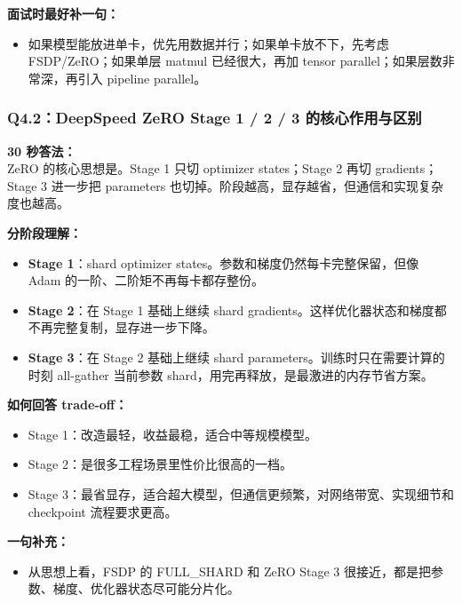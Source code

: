 \textbf{面试时最好补一句：}
\begin{itemize}[leftmargin=1.5em]
  \item 如果模型能放进单卡，优先用数据并行；如果单卡放不下，先考虑 FSDP/ZeRO；如果单层 matmul 已经很大，再加 tensor parallel；如果层数非常深，再引入 pipeline parallel。
\end{itemize}

\subsubsection{Q4.2：DeepSpeed ZeRO Stage 1 / 2 / 3 的核心作用与区别}

\begin{conceptbox}
\textbf{30 秒答法：}\\
ZeRO 的核心思想是。Stage 1 只切 optimizer states；Stage 2 再切 gradients；Stage 3 进一步把 parameters 也切掉。阶段越高，显存越省，但通信和实现复杂度也越高。
\end{conceptbox}

\textbf{分阶段理解：}
\begin{itemize}[leftmargin=1.5em]
  \item \textbf{Stage 1}：shard optimizer states。参数和梯度仍然每卡完整保留，但像 Adam 的一阶、二阶矩不再每卡都存整份。
  \item \textbf{Stage 2}：在 Stage 1 基础上继续 shard gradients。这样优化器状态和梯度都不再完整复制，显存进一步下降。
  \item \textbf{Stage 3}：在 Stage 2 基础上继续 shard parameters。训练时只在需要计算的时刻 all-gather 当前参数 shard，用完再释放，是最激进的内存节省方案。
\end{itemize}

\textbf{如何回答 trade-off：}
\begin{itemize}[leftmargin=1.5em]
  \item Stage 1：改造最轻，收益最稳，适合中等规模模型。
  \item Stage 2：是很多工程场景里性价比很高的一档。
  \item Stage 3：最省显存，适合超大模型，但通信更频繁，对网络带宽、实现细节和 checkpoint 流程要求更高。
\end{itemize}

\textbf{一句补充：}
\begin{itemize}[leftmargin=1.5em]
  \item 从思想上看，FSDP 的 FULL\_SHARD 和 ZeRO Stage 3 很接近，都是把参数、梯度、优化器状态尽可能分片化。
\end{itemize}

